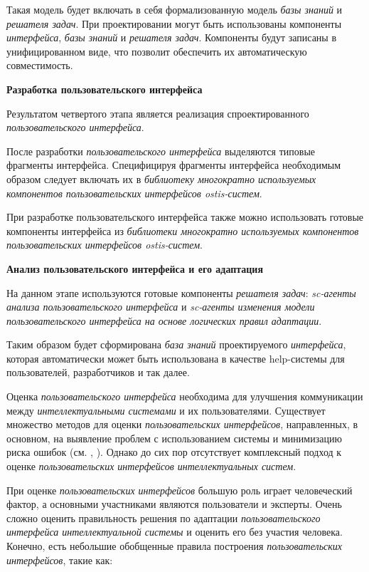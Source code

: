 Такая модель будет включать в себя формализованную модель \textit{базы знаний} и \textit{решателя задач}. При проектировании могут быть использованы компоненты \textit{интерфейса}, \textit{базы знаний} и \textit{решателя задач}. Компоненты будут записаны в унифицированном виде, что позволит обеспечить их автоматическую совместимость.

\textbf{Разработка пользовательского интерфейса}

Результатом четвертого этапа является реализация спроектированного \textit{пользовательского интерфейса}. 

После разработки \textit{пользовательского интерфейса} выделяются типовые фрагменты интерфейса. Специфицируя фрагменты интерфейса необходимым образом следует включать их в \textit{библиотеку многократно используемых компонентов пользовательских интерфейсов ostis-систем}.

При разработке пользовательского интерфейса также можно использовать готовые компоненты интерфейса из \textit{библиотеки многократно используемых компонентов пользовательских интерфейсов ostis-систем}.

\textbf{Анализ пользовательского интерфейса и его адаптация}

На данном этапе используются готовые компоненты \textit{решателя задач}: \textit{sc-агенты анализа пользовательского интерфейса} и \textit{sc-агенты изменения модели пользовательского интерфейса на основе логических правил адаптации}.

Таким образом будет сформирована \textit{база знаний} проектируемого \textit{интерфейса}, которая автоматически может быть использована в качестве help-системы для пользователей, разработчиков и так далее.


Оценка \textit{пользовательского интерфейса} необходима для улучшения коммуникации между \textit{интеллектуальными системами} и их пользователями. Существует множество методов для оценки \textit{пользовательских интерфейсов}, направленных, в основном, на выявление проблем с использованием системы и минимизацию риска ошибок (см. , ). Однако до сих пор отсутствует комплексный подход к оценке \textit{пользовательских интерфейсов интеллектуальных систем}.

При оценке \textit{пользовательских интерфейсов} большую роль играет человеческий фактор, а основными участниками являются пользователи и эксперты. Очень сложно оценить правильность решения по адаптации \textit{пользовательского интерфейса интеллектуальной системы} и оценить его без участия человека. Конечно, есть небольшие обобщенные правила построения \textit{пользовательских интерфейсов}, такие как:

